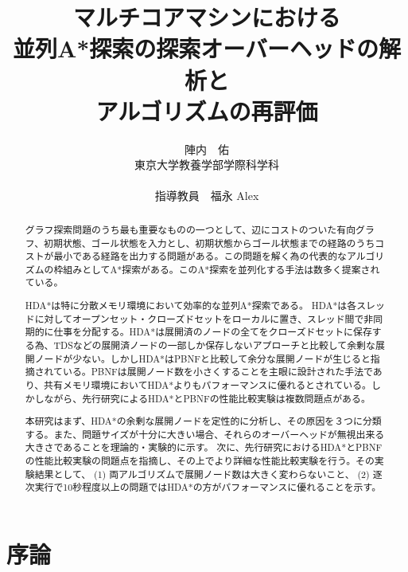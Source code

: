 \documentclass[uplatex]{jsarticle}
\title{マルチコアマシンにおける\\
並列A*探索の探索オーバーヘッドの解析と\\ %
アルゴリズムの再評価}
\author{陣内　佑 \\
東京大学教養学部学際科学科\\
\\
指導教員　福永 Alex}
\begin{document}
\maketitle
\thispagestyle{empty}

\begin{abstract}
グラフ探索問題のうち最も重要なものの一つとして、辺にコストのついた有向グラフ、初期状態、ゴール状態を入力とし、初期状態からゴール状態までの経路のうちコストが最小である経路を出力する問題がある。この問題を解く為の代表的なアルゴリズムの枠組みとしてA*探索がある。このA*探索を並列化する手法は数多く提案されている。

HDA*は特に分散メモリ環境において効率的な並列A*探索である。
HDA*は各スレッドに対してオープンセット・クローズドセットをローカルに置き、スレッド間で非同期的に仕事を分配する。HDA*は展開済のノードの全てをクローズドセットに保存する為、TDSなどの展開済ノードの一部しか保存しないアプローチと比較して余剰な展開ノードが少ない。しかしHDA*はPBNFと比較して余分な展開ノードが生じると指摘されている。PBNFは展開ノード数を小さくすることを主眼に設計された手法であり、共有メモリ環境においてHDA*よりもパフォーマンスに優れるとされている。しかしながら、先行研究によるHDA*とPBNFの性能比較実験は複数問題点がある。

本研究はまず、HDA*の余剰な展開ノードを定性的に分析し、その原因を３つに分類する。また、問題サイズが十分に大きい場合、それらのオーバーヘッドが無視出来る大きさであることを理論的・実験的に示す。
次に、先行研究におけるHDA*とPBNFの性能比較実験の問題点を指摘し、その上でより詳細な性能比較実験を行う。その実験結果として、 (1) 両アルゴリズムで展開ノード数は大きく変わらないこと、 (2) 逐次実行で10秒程度以上の問題ではHDA*の方がパフォーマンスに優れることを示す。
\end{abstract}

\newpage
\tableofcontents
\thispagestyle{empty}
\newpage

\section{序論}
\setcounter{page}{1}
\end{document}
